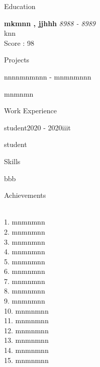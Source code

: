 \documentclass{resume}
\begin{document}
\begin{rSection}{Education}

{\bf mkmnn , jjhhh } \hfill {\em 8988 - 8989 }
\\ knn
\\ Score : 98 \\

\end{rSection}

\begin{rSection}{Projects}
\begin{rSubsection}{nnnnmn}{mnnn - mnmn}{mnnn}{}
\item mnmnmn
\end{rSubsection}
\end{rSection}

\begin{rSection}{Work Experience}

\begin{rSubsection}{student}{2020 - 2020}{iiit}{}
\item student
\end{rSubsection}
\end{rSection}

\begin{rSection}{Skills}

{bbb    }
\end{rSection}

\begin{rSection}{Achievements}

\\{ 1. mnmnmnn }
\\{ 2. mnmnmnn }
\\{ 3. mnmnmnn }
\\{ 4. mnmnmnn }
\\{ 5. mnmnmnn }
\\{ 6. mnmnmnn }
\\{ 7. mnmnmnn }
\\{ 8. mnmnmnn }
\\{ 9. mnmnmnn }
\\{ 10. mnmnmnn }
\\{ 11. mnmnmnn }
\\{ 12. mnmnmnn }
\\{ 13. mnmnmnn }
\\{ 14. mnmnmnn }
\\{ 15. mnmnmnn }
\end{rSection}
\end{document}

